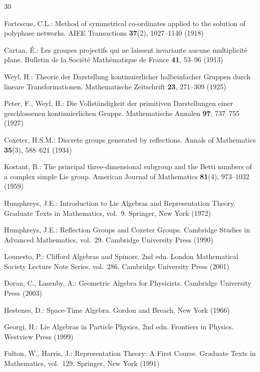 \documentclass[11pt]{article}
\begin{document}
\begin{thebibliography}{30}

Fortescue, C.L.:
Method of symmetrical co-ordinates applied to the solution of polyphase
networks.
AIEE Transactions \textbf{37}(2), 1027--1140 (1918)

Cartan, \'E.:
Les groupes projectifs qui ne laissent invariante aucune multiplicit\'e
plane.
Bulletin de la Soci\'et\'e Math\'ematique de France \textbf{41},
53--96 (1913)

Weyl, H.:
Theorie der Darstellung kontinuierlicher halbeinfacher Gruppen durch
lineare Transformationen.
Mathematische Zeitschrift \textbf{23}, 271--309 (1925)

Peter, F., Weyl, H.:
Die Vollst\"andigkeit der primitiven Darstellungen einer geschlossenen
kontinuierlichen Gruppe.
Mathematische Annalen \textbf{97}, 737--755 (1927)

Coxeter, H.S.M.:
Discrete groups generated by reflections.
Annals of Mathematics \textbf{35}(3), 588--621 (1934)

Kostant, B.:
The principal three-dimensional subgroup and the Betti numbers of a
complex simple Lie group.
American Journal of Mathematics \textbf{81}(4), 973--1032 (1959)

Humphreys, J.E.:
Introduction to Lie Algebras and Representation Theory.
Graduate Texts in Mathematics, vol.~9. Springer, New York (1972)

Humphreys, J.E.:
Reflection Groups and Coxeter Groups.
Cambridge Studies in Advanced Mathematics, vol.~29. Cambridge University
Press (1990)

Lounesto, P.:
Clifford Algebras and Spinors, 2nd edn.
London Mathematical Society Lecture Note Series, vol.~286. Cambridge
University Press (2001)

Doran, C., Lasenby, A.:
Geometric Algebra for Physicists.
Cambridge University Press (2003)

Hestenes, D.:
Space-Time Algebra.
Gordon and Breach, New York (1966)

Georgi, H.:
Lie Algebras in Particle Physics, 2nd edn.
Frontiers in Physics. Westview Press (1999)

Fulton, W., Harris, J.:
Representation Theory: A First Course.
Graduate Texts in Mathematics, vol.~129. Springer, New York (1991)


\end{thebibliography}
\end{document}
